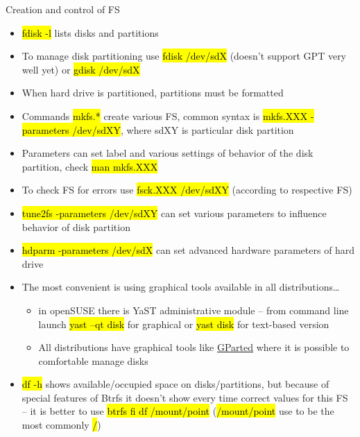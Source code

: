 \documentclass[compress, ucs, xelatex, 11pt, xcolor=svgnames,
  hyperref={
    bookmarks=true,
    unicode=true,
    colorlinks=true,
    pdftitle={Linux, command line and MetaCentrum},
    plainpages=false,
    pdfauthor={Vojtech Zeisek},
    pdfsubject={Course about use of Linux command line, writing shell scripts and using MetaCentrum of CESNET},
    pdfcreator={XeLaTeX},
    pdfkeywords={Linux, GNU, BASH, shell, command line, MetaCentrum},
    linkcolor=Red,
    anchorcolor=Blue,
    citecolor=Purple,
    filecolor=DodgerBlue,
    menucolor=DarkOrchid,
    urlcolor=DeepSkyBlue,
    pdftex},
  url={hyphens, lowtilde} %
  ]{beamer}
\renewcommand{\texttt}[1]{\hl{\ttfamily #1}}
\begin{document}
\begin{frame}[allowframebreaks]{Creation and control of FS}
\begin{itemize}
  \item \texttt{fdisk -l} lists disks and partitions
  \item To manage disk partitioning use \texttt{fdisk /dev/sdX} (doesn't support GPT very well yet) or \texttt{gdisk /dev/sdX}
  \item When hard drive is partitioned, partitions must be formatted
  \item Commands \texttt{mkfs.*} create various FS, common syntax is \texttt{mkfs.XXX -parameters /dev/sdXY}, where sdXY is particular disk partition
  \item Parameters can set label and various settings of behavior of the disk partition, check \texttt{man mkfs.XXX}
  \item To check FS for errors use \texttt{fsck.XXX /dev/sdXY} (according to respective FS)
  \item \texttt{tune2fs -parameters /dev/sdXY} can set various parameters to influence behavior of disk partition
  \item \texttt{hdparm -parameters /dev/sdX} can set advanced hardware parameters of hard drive
  \item The most convenient is using graphical tools available in all distributions\ldots
  \begin{itemize}
    \item in openSUSE there is YaST administrative module -- from command line launch \texttt{yast --qt disk} for graphical or \texttt{yast disk} for text-based version
    \item All distributions have graphical tools like \href{http://gparted.org/}{GParted} where it is possible to comfortable manage disks
  \end{itemize}
  \item \texttt{df -h} shows available/occupied space on disks/partitions, but because of special features of Btrfs it doesn't show every time correct values for this FS -- it is better to use \texttt{btrfs fi df /mount/point} (\texttt{/mount/point} use to be the most commonly \texttt{/})
\end{itemize}
\end{frame}

\end{document}
